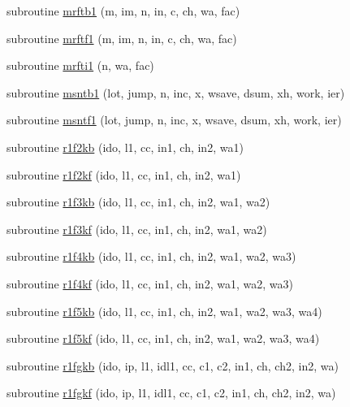 \begin{DoxyCompactItemize}
\item 
subroutine \mbox{\hyperlink{namespacefftclass_a025f68a6ddd573ad3fa337835b621d3c}{mrftb1}} (m, im, n, in, c, ch, wa, fac)
\item 
subroutine \mbox{\hyperlink{namespacefftclass_a5b17cd46c9d021ed6dfe9499fc802b3f}{mrftf1}} (m, im, n, in, c, ch, wa, fac)
\item 
subroutine \mbox{\hyperlink{namespacefftclass_a88a3f7fd420d15d4e4d603d4d8ebf38e}{mrfti1}} (n, wa, fac)
\item 
subroutine \mbox{\hyperlink{namespacefftclass_aebd25014fd97baa3be31bda9b446e99f}{msntb1}} (lot, jump, n, inc, x, wsave, dsum, xh, work, ier)
\item 
subroutine \mbox{\hyperlink{namespacefftclass_a151bd1685dbe69c9c36a08ff00a7e10e}{msntf1}} (lot, jump, n, inc, x, wsave, dsum, xh, work, ier)
\item 
subroutine \mbox{\hyperlink{namespacefftclass_a6cf75b3c3c340adb4eb40e50289cf439}{r1f2kb}} (ido, l1, cc, in1, ch, in2, wa1)
\item 
subroutine \mbox{\hyperlink{namespacefftclass_a9d3bdd521a616fe934704cb38ac074f4}{r1f2kf}} (ido, l1, cc, in1, ch, in2, wa1)
\item 
subroutine \mbox{\hyperlink{namespacefftclass_ad450dc5bf08d49d4784e609c41b42950}{r1f3kb}} (ido, l1, cc, in1, ch, in2, wa1, wa2)
\item 
subroutine \mbox{\hyperlink{namespacefftclass_a382f39146e7d8e1450810efdc6f4cd79}{r1f3kf}} (ido, l1, cc, in1, ch, in2, wa1, wa2)
\item 
subroutine \mbox{\hyperlink{namespacefftclass_a71f9b9a5e0173f9ddef4dd0fc92e6164}{r1f4kb}} (ido, l1, cc, in1, ch, in2, wa1, wa2, wa3)
\item 
subroutine \mbox{\hyperlink{namespacefftclass_ac2e28efef69b7ac5c599c51dc9be973d}{r1f4kf}} (ido, l1, cc, in1, ch, in2, wa1, wa2, wa3)
\item 
subroutine \mbox{\hyperlink{namespacefftclass_a42f5de07f4eb994cbe15a8526291566b}{r1f5kb}} (ido, l1, cc, in1, ch, in2, wa1, wa2, wa3, wa4)
\item 
subroutine \mbox{\hyperlink{namespacefftclass_acc419931cfa3ec3e19e6264b35e83aae}{r1f5kf}} (ido, l1, cc, in1, ch, in2, wa1, wa2, wa3, wa4)
\item 
subroutine \mbox{\hyperlink{namespacefftclass_aa5cb9e2d3b6aa9d5adcb4144cd17f10e}{r1fgkb}} (ido, ip, l1, idl1, cc, c1, c2, in1, ch, ch2, in2, wa)
\item 
subroutine \mbox{\hyperlink{namespacefftclass_adb327056327448d0a605271d57091578}{r1fgkf}} (ido, ip, l1, idl1, cc, c1, c2, in1, ch, ch2, in2, wa)

\end{DoxyCompactItemize}
